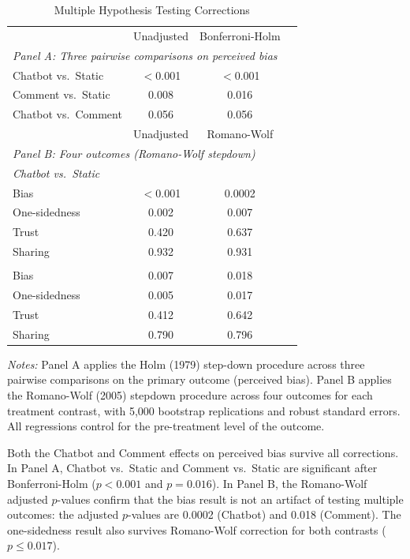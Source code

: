 \documentclass[12pt]{article}
\begin{document}
\begin{table}[H]
\centering
\caption{Multiple Hypothesis Testing Corrections}
\label{tab:mht}
\begin{tabular}{lccc}
\toprule
 & Unadjusted & Bonferroni-Holm & \\
\multicolumn{4}{l}{\textit{Panel A: Three pairwise comparisons on perceived bias}} \\
\midrule
Chatbot vs.\ Static  & $<$0.001 & $<$0.001 & \\
Comment vs.\ Static  & 0.008  & 0.016  & \\
Chatbot vs.\ Comment & 0.056  & 0.056  & \\
\addlinespace
 & Unadjusted & Romano-Wolf & \\
\multicolumn{4}{l}{\textit{Panel B: Four outcomes (Romano-Wolf stepdown)}} \\
\midrule
\multicolumn{4}{l}{\textit{Chatbot vs.\ Static}} \\
\quad Bias            & $<$0.001 & 0.0002 & \\
\quad One-sidedness   & 0.002  & 0.007  & \\
\quad Trust           & 0.420  & 0.637  & \\
\quad Sharing         & 0.932  & 0.931  & \\
\addlinespace
\multicolumn{4}{l}{\textit{Comment vs.\ Static}} \\
\quad Bias            & 0.007  & 0.018  & \\
\quad One-sidedness   & 0.005  & 0.017  & \\
\quad Trust           & 0.412  & 0.642  & \\
\quad Sharing         & 0.790  & 0.796  & \\
\bottomrule
\end{tabular}
\par\vspace{4pt}
\begin{minipage}{\textwidth}
\footnotesize \textit{Notes:} Panel A applies the Holm (1979) step-down procedure across three pairwise comparisons on the primary outcome (perceived bias). Panel B applies the Romano-Wolf (2005) stepdown procedure across four outcomes for each treatment contrast, with 5,000 bootstrap replications and robust standard errors. All regressions control for the pre-treatment level of the outcome.
\end{minipage}
\end{table}

Both the Chatbot and Comment effects on perceived bias survive all corrections. In Panel A, Chatbot vs.\ Static and Comment vs.\ Static are significant after Bonferroni-Holm ($p<0.001$ and $p=0.016$). In Panel B, the Romano-Wolf adjusted $p$-values confirm that the bias result is not an artifact of testing multiple outcomes: the adjusted $p$-values are 0.0002 (Chatbot) and 0.018 (Comment). The one-sidedness result also survives Romano-Wolf correction for both contrasts ($p \leq 0.017$).
\end{document}
